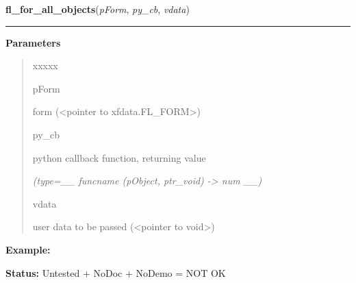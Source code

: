     \label{xformslib:library:fl_for_all_objects}

    \vspace{0.5ex}

\hspace{.8\funcindent}\begin{boxedminipage}{\funcwidth}

    \raggedright \textbf{fl\_for\_all\_objects}(\textit{pForm}, \textit{py\_cb}, \textit{vdata})

    \vspace{-1.5ex}

    \rule{\textwidth}{0.5\fboxrule}
\setlength{\parskip}{2ex}
\setlength{\parskip}{1ex}
      \textbf{Parameters}
      \vspace{-1ex}

      \begin{quote}
        \begin{Ventry}{xxxxx}

          \item[pForm]

          form ({\textless}pointer to xfdata.FL\_FORM{\textgreater})

          \item[py\_cb]

          python callback function, returning value

            {\it (type=\_\_ funcname (pObject, ptr\_void) -{\textgreater} num \_\_)}

          \item[vdata]

          user data to be passed ({\textless}pointer to void{\textgreater})

        \end{Ventry}

      \end{quote}

\textbf{Example:} 

\textbf{Status:} Untested + NoDoc + NoDemo = NOT OK



    \end{boxedminipage}

    \label{xformslib:library:fl_set_object_dblclick}

